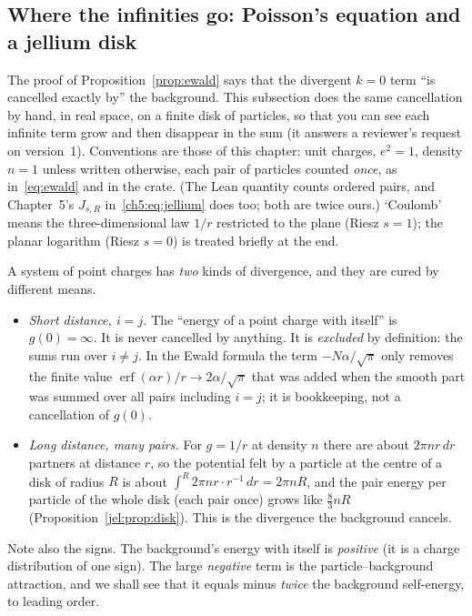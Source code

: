 \subsection{Where the infinities go: Poisson's equation and a jellium disk}\label{jel:sec}

The proof of Proposition~\ref{prop:ewald} says that the divergent $k=0$ term ``is cancelled exactly by'' the
background. This subsection does the same cancellation by hand, in real space, on a finite disk of particles, so that
you can see each infinite term grow and then disappear in the sum (it answers a reviewer's request on version~1).
Conventions are those of this chapter: unit charges, $e^2=1$, density $n=1$ unless written otherwise, each pair of
particles counted \emph{once}, as in~\eqref{eq:ewald} and in the crate. (The Lean quantity  counts
ordered pairs, and Chapter~5's $J_{s,R}$ in~\eqref{ch5:eq:jellium} does too; both are twice ours.) `Coulomb' means the
three-dimensional law $1/r$ restricted to the plane (Riesz $s=1$); the planar logarithm (Riesz $s=0$) is treated
briefly at the end.

\begin{warnbox}
A system of point charges has \emph{two} kinds of divergence, and they are cured by different means.
\begin{itemize}[leftmargin=*]
\item \emph{Short distance, $i=j$.} The ``energy of a point charge with itself'' is $g(0)=\infty$. It is never
  cancelled by anything. It is \emph{excluded} by definition: the sums run over $i\ne j$. In the Ewald formula the
  term $-N\alpha/\sqrt\pi$ only removes the finite value $\operatorname{erf}(\alpha r)/r\to2\alpha/\sqrt\pi$ that was
  added when the smooth part was summed over all pairs including $i=j$; it is bookkeeping, not a cancellation of
  $g(0)$.
\item \emph{Long distance, many pairs.} For $g=1/r$ at density $n$ there are about $2\pi n r\,dr$ partners at distance
  $r$, so the potential felt by a particle at the centre of a disk of radius $R$ is about
  $\int^R 2\pi n r\cdot r^{-1}\,dr=2\pi nR$, and the pair energy per particle of the whole disk (each pair once)
  grows like $\frac83nR$ (Proposition~\ref{jel:prop:disk}). This is the divergence the background cancels.
\end{itemize}
Note also the signs. The background's energy with itself is \emph{positive} (it is a charge distribution of one sign).
The large \emph{negative} term is the particle--background attraction, and we shall see that it equals minus
\emph{twice} the background self-energy, to leading order.
\end{warnbox}

